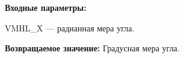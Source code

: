 \textbf{Входные параметры:}

 VMHL\_X --- радианная мера угла.

\textbf{Возвращаемое значение:}
Градусная мера угла.
